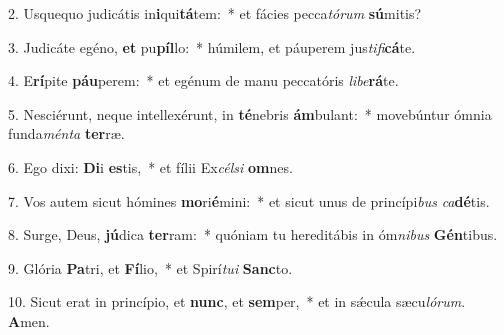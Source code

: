 2. Usquequo judicátis in\textbf{i}qui\textbf{tá}tem:~*  et fácies pecca\textit{tó}\textit{rum} \textbf{sú}mitis?\

3. Judicáte egéno, \textbf{et} pu\textbf{píl}lo:~*  húmilem, et páuperem jus\textit{ti}\textit{fi}\textbf{cá}te.\

4. E\textbf{rí}pite \textbf{páu}perem:~*  et egénum de manu peccatóris \textit{li}\textit{be}\textbf{rá}te.\

5. Nesciérunt, neque intellexérunt, in \textbf{té}nebris \textbf{ám}bulant:~*  movebúntur ómnia funda\textit{mén}\textit{ta} \textbf{ter}ræ.\

6. Ego dixi: \textbf{Di}i \textbf{es}tis,~*  et fílii Ex\textit{cél}\textit{si} \textbf{om}nes.\

7. Vos autem sicut hómines \textbf{mo}ri\textbf{é}mini:~*  et sicut unus de princípi\textit{bus} \textit{ca}\textbf{dé}tis.\

8. Surge, Deus, \textbf{jú}dica \textbf{ter}ram:~*  quóniam tu hereditábis in óm\textit{ni}\textit{bus} \textbf{Gén}tibus.\

9. Glória \textbf{Pa}tri, et \textbf{Fí}lio,~*  et Spirí\textit{tu}\textit{i} \textbf{Sanc}to.\

10. Sicut erat in princípio, et \textbf{nunc}, et \textbf{sem}per,~*  et in sǽcula sæcu\textit{ló}\textit{rum}. \textbf{A}men.\

